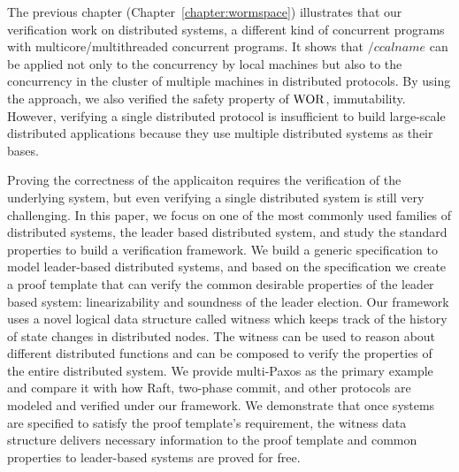 The previous chapter (Chapter~\ref{chapter:wormspace}) illustrates that our verification work on distributed systems, 
a different kind of concurrent programs with multicore/multithreaded concurrent programs. 
It shows 
that $/ccalname$ can be applied not only to the concurrency by local machines
but also to the concurrency in the cluster of multiple machines in distributed protocols. 
By using the approach, we also verified the safety property of $\mathrm{WOR}$, immutability. 
However, verifying a single distributed protocol is insufficient to build large-scale distributed applications because they use multiple distributed systems as their bases.

Proving the correctness of the applicaiton requires the verification of the underlying system, but even verifying a single distributed system is
still very challenging. In this paper, we focus on one of the most commonly
used families of distributed systems, the leader based distributed system, and study the standard properties to build a verification framework.
We build a generic specification to model leader-based distributed systems, and based on
the specification we create a proof template that can verify the common
desirable properties of the leader based system: linearizability and soundness of
the leader election. 
Our framework uses a novel logical data structure called witness which keeps track of the history of state changes in distributed nodes.
The witness can be used to reason about different distributed functions and can
be composed to verify the properties of the entire distributed system. We provide
multi-Paxos as the primary example and compare it with
how Raft, two-phase commit, and other protocols are modeled and verified under
our framework. 
We demonstrate that once systems are specified to satisfy the proof template's requirement, the witness data structure delivers necessary
information to the proof template and common properties to leader-based systems are proved for free. 






